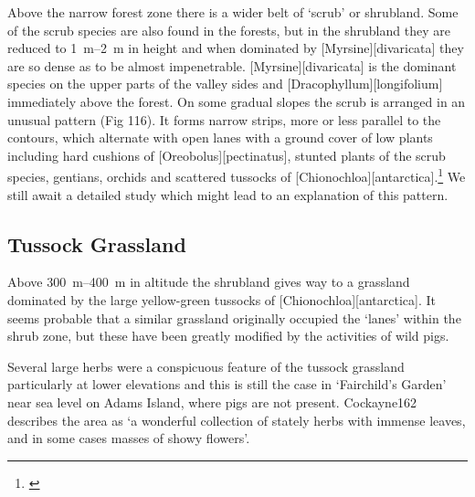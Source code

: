 Above the narrow forest zone there is a wider belt of `scrub' or shrubland.
Some of the scrub species are also found in the forests, but in the shrubland they are reduced to \SIrange{1}{2}{\metre} in height and when dominated by [Myrsine][divaricata] they are so dense as to be almost impenetrable. [Myrsine][divaricata] is the dominant species on the upper parts of the valley sides and [Dracophyllum][longifolium] immediately above the  forest.
On some gradual slopes the scrub is arranged in an unusual pattern (Fig 116).
It forms narrow strips, more or less parallel to the contours, which alternate with open lanes with a ground cover of low plants including hard cushions of [Oreobolus][pectinatus], stunted plants of the scrub species, gentians, orchids and scattered tussocks of [Chionochloa][antarctica].\footnote{\cite{godley1965notes}}
We still await a detailed study which might lead to an explanation of this pattern.

\subsection{Tussock Grassland}

Above \SIrange{300}{400}{\metre} in altitude the shrubland gives way to a grassland dominated by the large yellow-green tussocks of [Chionochloa][antarctica].
It seems probable that a similar grassland originally occupied the `lanes' within the shrub zone, but these have been greatly modified by the activities of wild pigs.

Several large herbs were a conspicuous feature of the tussock grassland particularly at lower elevations and this is still the case in `Fairchild's Garden' near sea level on Adams Island, where pigs are not present.
Cockayne162 describes the area as `a wonderful collection of stately herbs with immense leaves, and in some cases masses of showy flowers'.

